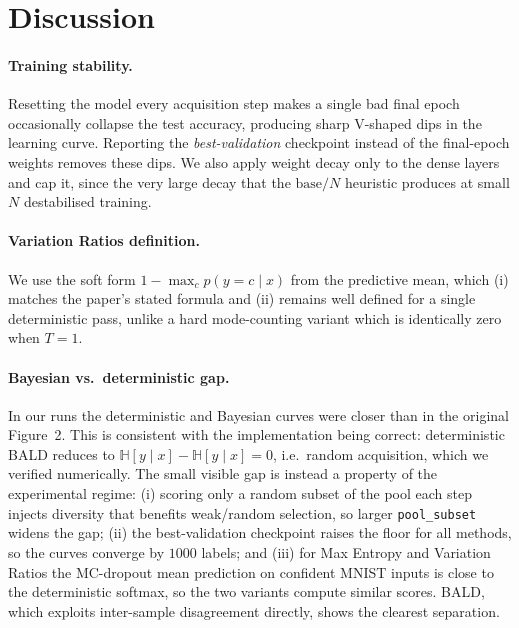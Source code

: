 \documentclass[11pt]{article}
\begin{document}
\section{Discussion}
\label{sec:discussion}

\paragraph{Training stability.}
Resetting the model every acquisition step makes a single bad final epoch
occasionally collapse the test accuracy, producing sharp V-shaped dips in the
learning curve. Reporting the \emph{best-validation} checkpoint instead of the
final-epoch weights removes these dips. We also apply weight decay only to the
dense layers and cap it, since the very large decay that the
$\text{base}/N$ heuristic produces at small $N$ destabilised training.

\paragraph{Variation Ratios definition.}
We use the soft form $1-\max_c p(y=c\mid x)$ from the predictive mean, which (i)
matches the paper's stated formula and (ii) remains well defined for a single
deterministic pass, unlike a hard mode-counting variant which is identically
zero when $T=1$.

\paragraph{Bayesian vs.\ deterministic gap.}
In our runs the deterministic and Bayesian curves were closer than in the
original Figure~2. This is consistent with the implementation being correct:
deterministic BALD reduces to $\mathbb{H}[y\mid x]-\mathbb{H}[y\mid x]=0$, i.e.\
random acquisition, which we verified numerically. The small visible gap is
instead a property of the experimental regime: (i) scoring only a random subset
of the pool each step injects diversity that benefits weak/random selection, so
larger \texttt{pool\_subset} widens the gap; (ii) the best-validation
checkpoint raises the floor for all methods, so the curves converge by $1000$
labels; and (iii) for Max Entropy and Variation Ratios the MC-dropout mean
prediction on confident MNIST inputs is close to the deterministic softmax, so
the two variants compute similar scores. BALD, which exploits inter-sample
disagreement directly, shows the clearest separation.
\end{document}
